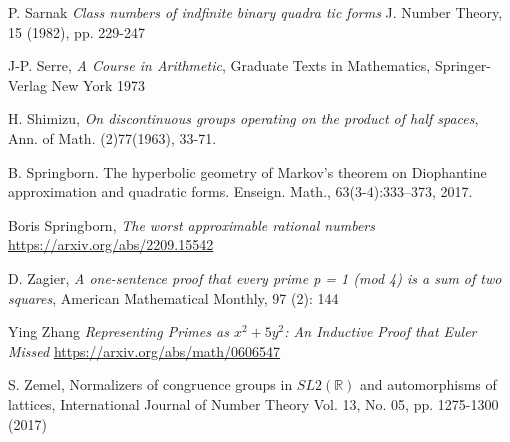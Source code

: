 \documentclass[12pt,a4paper]{amsart}
\def\RR{\mathbb{R}}
\begin{document}

P. Sarnak
\textit{Class numbers of indfinite binary quadra tic forms}
J. Number Theory, 15 (1982), pp. 229-247

J-P. Serre,
\textit{A Course in Arithmetic},
Graduate Texts in Mathematics,
Springer-Verlag New York
1973

H. Shimizu, 
\textit{On discontinuous groups operating on the product of half spaces}, Ann. of Math. (2)77(1963), 33-71.


B. Springborn. The hyperbolic geometry of Markov’s theorem on Diophantine
approximation and quadratic forms. Enseign. Math., 63(3-4):333–373, 2017.

Boris Springborn,
\textit{The worst approximable rational numbers}
\url{https://arxiv.org/abs/2209.15542}



D. Zagier,
 \textit{A one-sentence proof that every prime p = 1 (mod 4) is a sum of two squares}, 
 American Mathematical Monthly, 97 (2): 144
 
Ying Zhang
\textit{Representing Primes as $x^2 + 5y^2$: An Inductive Proof that Euler Missed}
\url{https://arxiv.org/abs/math/0606547}

S. Zemel,
Normalizers of congruence groups in $SL2(\RR)$ and automorphisms of
lattices,
International Journal of Number Theory Vol. 13, No. 05, pp. 1275-1300 (2017)


 






\end{document}
